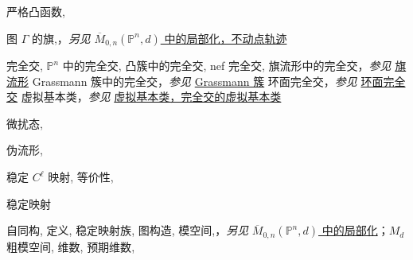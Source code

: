 \begin{theindex}
\subitem \leavevmode\hypertarget{idx:0182}{严格凸函数},\enspace{}
\indexspace
\item \leavevmode\hypertarget{idx:0327}{图 $\Gamma$ 的旗},\enspace{}，\textit{另见} \hyperlink{idx:0726}{$\overline M_{0,n}(\mathbb P^n,d)$ 中的局部化，不动点轨迹}
\indexspace
\item \leavevmode\hypertarget{idx:0131}{完全交},\enspace{}
\subitem \leavevmode\hypertarget{idx:0132}{$\mathbb P^n$ 中的完全交},\enspace{}
\subitem \leavevmode\hypertarget{idx:0133}{凸簇中的完全交},\enspace{}
\subsubitem \leavevmode\hypertarget{idx:0134}{nef 完全交},\enspace{}
\subitem \leavevmode\hypertarget{idx:0135}{旗流形中的完全交}，\textit{参见} \hyperlink{idx:0324}{旗流形}
\subitem \leavevmode\hypertarget{idx:0136}{Grassmann 簇中的完全交}，\textit{参见} \hyperlink{idx:0454}{Grassmann 簇}
\subitem \leavevmode\hypertarget{idx:0137}{环面完全交}，\textit{参见} \hyperlink{idx:1347}{环面完全交}
\subitem \leavevmode\hypertarget{idx:0138}{虚拟基本类}，\textit{参见} \hyperlink{idx:1419}{虚拟基本类，完全交的虚拟基本类}
\indexspace
\item \leavevmode\hypertarget{idx:1040}{微扰态},\enspace{}
\indexspace
\item \leavevmode\hypertarget{idx:1100}{伪流形},\enspace{}
\indexspace
\item \leavevmode\hypertarget{idx:1269}{稳定 $C^\ell$ 映射},\enspace{}
\subitem \leavevmode\hypertarget{idx:1270}{等价性},\enspace{}
\indexspace
\item \leavevmode\hypertarget{idx:1271}{稳定映射}
\subitem \leavevmode\hypertarget{idx:1272}{自同构},\enspace{}
\subitem \leavevmode\hypertarget{idx:1273}{定义},\enspace{}
\subitem \leavevmode\hypertarget{idx:1274}{稳定映射族},\enspace{}
\subitem \leavevmode\hypertarget{idx:1275}{图构造},\enspace{}
\subitem \leavevmode\hypertarget{idx:1276}{模空间},\enspace{}，\textit{另见} \hyperlink{idx:0725}{$\overline M_{0,n}(\mathbb P^n,d)$ 中的局部化}；\hyperlink{idx:0777}{$M_d$}
\subsubitem \leavevmode\hypertarget{idx:1277}{粗模空间},\enspace{}
\subsubitem \leavevmode\hypertarget{idx:1278}{维数},\enspace{}
\subsubitem \leavevmode\hypertarget{idx:1279}{预期维数},\enspace{}

\end{theindex}

